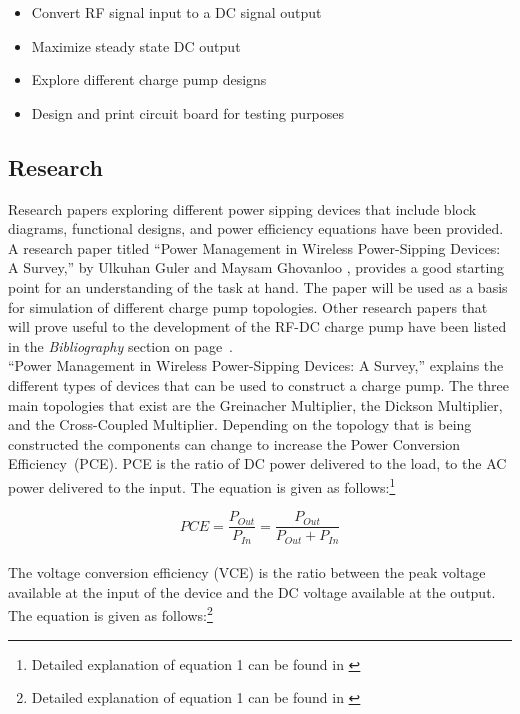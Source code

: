 \documentclass[12pt]{article}
\begin{document}
\begin{itemize}
	\item Convert RF signal input to a DC signal output
	\item Maximize steady state DC output
	\item Explore different charge pump designs
	\item Design and print circuit board for testing purposes
\end{itemize}
	
	\subsection{Research}
	Research papers exploring different power sipping devices that include block diagrams, functional designs, and power efficiency equations have been provided. A research paper titled ``Power Management in Wireless Power-Sipping Devices: A Survey,” by Ulkuhan Guler and Maysam Ghovanloo \cite{Guler}, provides a good starting point for an understanding of the task at hand. The paper will be used as a basis for simulation of different charge pump topologies. Other research papers that will prove useful to the development of the RF-DC charge pump have been listed in the \textit{Bibliography} section on page~\pageref{bibliography}.\\
	
	\noindent “Power Management in Wireless Power-Sipping Devices: A Survey,” explains the different types of devices that can be used to construct a charge pump. The three main topologies that exist are the Greinacher Multiplier, the Dickson Multiplier, and the Cross-Coupled Multiplier. Depending on the topology that is being constructed the components can change to increase the Power Conversion Efficiency~(PCE). PCE is the ratio of DC power delivered to the load, to the AC power delivered to the input. The equation is given as follows:\footnote{Detailed explanation of equation 1 can be found in \cite{Guler}}
	
\begin{equation}
PCE = \frac{P_{Out}}{P_{In}} = \frac{P_{Out}}{P_{Out} + P_{In}}\label{eq:PCE}
\end{equation}
\vspace{1em}
\\
The voltage conversion efficiency (VCE) is the ratio between the peak voltage available at the input of the device and the DC voltage available at the output. The equation is given as follows:\footnote{Detailed explanation of equation 1 can be found in \cite{Guler}}
\end{document}
